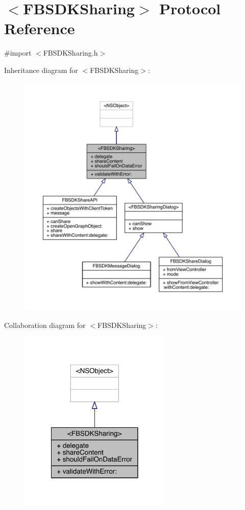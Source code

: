 \hypertarget{protocol_f_b_s_d_k_sharing-p}{\section{$<$F\-B\-S\-D\-K\-Sharing$>$ Protocol Reference}
\label{protocol_f_b_s_d_k_sharing-p}
}


{\ttfamily \#import $<$F\-B\-S\-D\-K\-Sharing.\-h$>$}



Inheritance diagram for $<$F\-B\-S\-D\-K\-Sharing$>$\-:
\nopagebreak
\begin{figure}[H]
\begin{center}
\leavevmode
\includegraphics[width=350pt]{protocol_f_b_s_d_k_sharing-p__inherit__graph}
\end{center}
\end{figure}


Collaboration diagram for $<$F\-B\-S\-D\-K\-Sharing$>$\-:
\nopagebreak
\begin{figure}[H]
\begin{center}
\leavevmode
\includegraphics[width=206pt]{protocol_f_b_s_d_k_sharing-p__coll__graph}
\end{center}
\end{figure}
